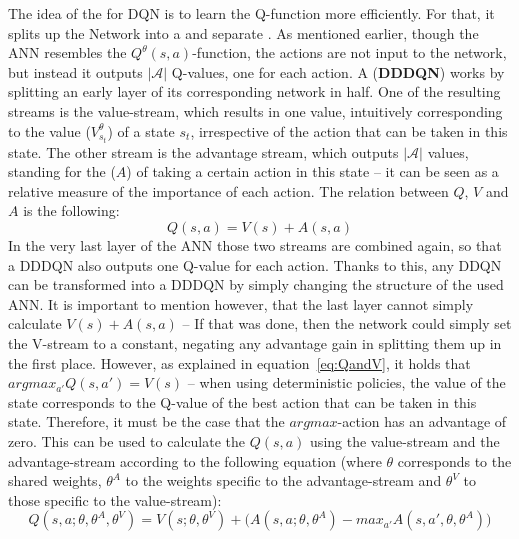 The idea of the \cite{wang_dueling_2015} for DQN is to learn the Q-function more efficiently. For that, it splits up the Network into a  and separate . As mentioned earlier, though the ANN resembles the $Q^\theta(s,a)$-function, the actions are not input to the network, but instead it outputs $|\mathcal{A}|$ Q-values, one for each action. A  (\textbf{DDDQN}) works by splitting an early layer of its corresponding network in half. One of the resulting streams is the value-stream, which results in one value, intuitively corresponding to the value ($V^\theta_{s_t}$) of a state $s_t$, irrespective of the action that can be taken in this state. The other stream is  the advantage stream, which outputs $|\mathcal{A}|$ values, standing for the  ($A$) of taking a certain action in this state -- it can be seen as a relative measure of the importance of each action. The relation between $Q$, $V$ and $A$ is the following:
\begin{equation*}
	Q(s,a) = V(s) + A(s,a)
\end{equation*}
In the very last layer of the ANN those two streams are combined again, so that a DDDQN also outputs one Q-value for each action. Thanks to this, any DDQN can be transformed into a DDDQN by simply changing the structure of the used ANN. It is important to mention however, that the last layer cannot simply calculate $V(s) + A(s,a)$ -- If that was done, then the network could simply set the V-stream to a constant, negating any advantage gain in splitting them up in the first place. However, as explained in equation~\ref{eq:QandV}, it holds that $argmax_{a'}Q(s,a') = V(s)$ -- when using deterministic policies, the value of the state corresponds to the Q-value of the best action that can be taken in this state. Therefore, it must be the case that the $argmax$-action has an advantage of zero. This can be used to calculate the $Q(s,a)$ using the value-stream and the advantage-stream according to the following equation (where $\theta$ corresponds to the shared weights, $\theta^A$ to the weights specific to the advantage-stream and $\theta^V$ to those specific to the value-stream):
\begin{equation*}
	Q(s,a; \theta, \theta^A, \theta^V) = V(s; \theta, \theta^V) + \big( A(s,a; \theta, \theta^A) - max_{a'}A(s,a',\theta, \theta^A) \big)
\end{equation*}
